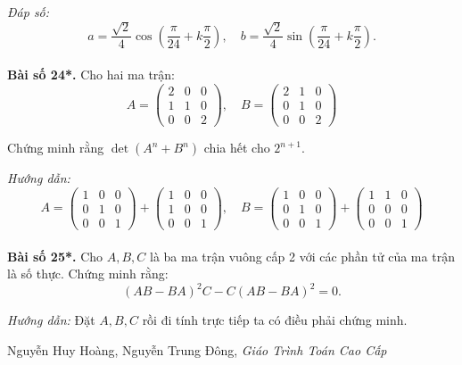         \textit{Đáp số:}
        \[
        a = \frac{\sqrt{2}}{4} \cos \left( \frac{\pi}{24} + k \frac{\pi}{2} \right), \quad b = \frac{\sqrt{2}}{4} \sin \left( \frac{\pi}{24} + k \frac{\pi}{2} \right).
        \]\\
\textbf{Bài số 24*.} Cho hai ma trận:
        \[
        A = \begin{pmatrix}
        2 & 0 & 0 \\
        1 & 1 & 0 \\
        0 & 0 & 2
        \end{pmatrix}, \quad B = \begin{pmatrix}
        2 & 1 & 0 \\
        0 & 1 & 0 \\
        0 & 0 & 2
        \end{pmatrix}
        \]
        
        Chứng minh rằng \(\det(A^n + B^n)\) chia hết cho \(2^{n+1}\).
        
        \textit{Hướng dẫn:}
        \[
        A = \begin{pmatrix}
        1 & 0 & 0 \\
        0 & 1 & 0 \\
        0 & 0 & 1
        \end{pmatrix} + \begin{pmatrix}
        1 & 0 & 0 \\
        1 & 0 & 0 \\
        0 & 0 & 1
        \end{pmatrix}, \quad B = \begin{pmatrix}
        1 & 0 & 0 \\
        0 & 1 & 0 \\
        0 & 0 & 1
        \end{pmatrix} + \begin{pmatrix}
        1 & 1 & 0 \\
        0 & 0 & 0 \\
        0 & 0 & 1
        \end{pmatrix}
        \]\\
\textbf{Bài số 25*.} Cho \(A, B, C\) là ba ma trận vuông cấp 2 với các phần tử của ma trận là số thực. Chứng minh rằng:
        \[
        (AB - BA)^2C - C(AB - BA)^2 = 0.
        \]
        
        \textit{Hướng dẫn:} Đặt \(A, B, C\) rồi đi tính trực tiếp ta có điều phải chứng minh.
\newpage
\begin{thebibliography}{9}
    Nguyễn Huy Hoàng, Nguyễn Trung Đông,
    {\em Giáo Trình Toán Cao Cấp}
\end{thebibliography}
